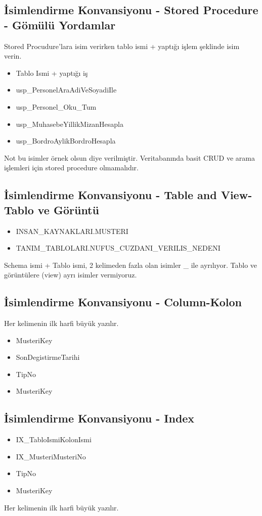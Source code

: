 \documentclass[10pt,a4paper,draft]{article}
\begin{document}
\subsection{İsimlendirme Konvansiyonu - Stored Procedure - Gömülü Yordamlar }  

Stored Procudure'lara isim verirken tablo ismi + yaptığı işlem şeklinde  isim verin.
    

\begin{itemize}
\item Tablo Ismi + yaptığı iş 
\item usp\_PersonelAraAdiVeSoyadiIle 
\item usp\_Personel\_Oku\_Tum 
\item usp\_MuhasebeYillikMizanHesapla
\item usp\_BordroAylikBordroHesapla
\end{itemize}

Not bu isimler örnek olsun diye verilmiştir. 
Veritabanında basit CRUD ve arama işlemleri için stored procedure olmamalıdır.

\subsection{İsimlendirme Konvansiyonu - Table and View-Tablo ve Görüntü}  

\begin{itemize}
\item INSAN\_KAYNAKLARI.MUSTERI 
\item TANIM\_TABLOLARI.NUFUS\_CUZDANI\_VERILIS\_NEDENI
\end{itemize}  

Schema ismi + Tablo ismi, 2 kelimeden fazla olan isimler \_ ile ayrılıyor. 
Tablo ve görüntülere (view) ayrı isimler vermiyoruz.		  

\subsection{İsimlendirme Konvansiyonu - Column-Kolon}  
Her kelimenin ilk harfi büyük yazılır. 
\begin{itemize}
\item MusteriKey 
\item SonDegistirmeTarihi
\item TipNo
\item MusteriKey
\end{itemize}  


\subsection{İsimlendirme Konvansiyonu - Index}  
\begin{itemize}
\item IX\_TabloIsmiKolonIsmi 
\item IX\_MusteriMusteriNo
\item TipNo
\item MusteriKey
\end{itemize}  
Her kelimenin ilk harfi büyük yazılır.
\end{document}
